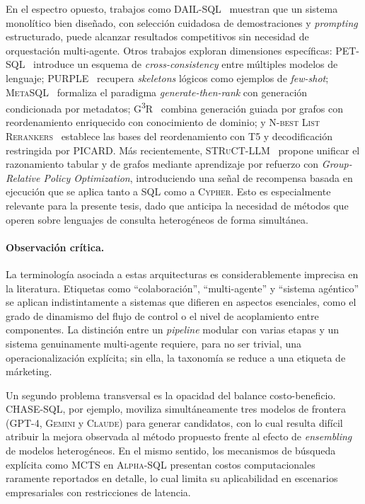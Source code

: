 En el espectro opuesto, trabajos como \textsc{DAIL-SQL}~\cite{DAIL-SQL2023}
muestran que un sistema monolítico bien diseñado, con selección cuidadosa de
demostraciones y \emph{prompting} estructurado, puede alcanzar resultados
competitivos sin necesidad de orquestación multi-agente. Otros trabajos
exploran dimensiones específicas: \textsc{PET-SQL}~\cite{PET-SQL2024}
introduce un esquema de \emph{cross-consistency} entre múltiples modelos de
lenguaje; \textsc{PURPLE}~\cite{PURPLE2024} recupera \emph{skeletons} lógicos
como ejemplos de \emph{few-shot}; \textsc{MetaSQL}~\cite{MetaSQL2024}
formaliza el paradigma \emph{generate-then-rank} con generación condicionada
por metadatos; \textsc{G\textsuperscript{3}R}~\cite{G3R2023} combina
generación guiada por grafos con reordenamiento enriquecido con conocimiento
de dominio; y \textsc{N-best List Rerankers}~\cite{N-bestListRerankers2022}
establece las bases del reordenamiento con \textsc{T5} y decodificación
restringida por \textsc{PICARD}. Más recientemente,
\textsc{STRuCT-LLM}~\cite{STRuCT-LLM2026} propone unificar el razonamiento tabular y de grafos mediante aprendizaje
por refuerzo con \emph{Group-Relative Policy Optimization}, introduciendo
una señal de recompensa basada en ejecución que se aplica tanto a \ac{SQL}
como a \textsc{Cypher}. Esto es especialmente relevante para la presente
tesis, dado que anticipa la necesidad de métodos que operen sobre lenguajes
de consulta heterogéneos de forma simultánea.

\paragraph{Observación crítica.} La terminología asociada a estas
arquitecturas es considerablemente imprecisa en la literatura. Etiquetas
como ``colaboración'', ``multi-agente'' y ``sistema agéntico'' se aplican
indistintamente a sistemas que difieren en aspectos esenciales, como el
grado de dinamismo del flujo de control o el nivel de acoplamiento entre
componentes. La distinción entre un \emph{pipeline} modular con varias etapas
y un sistema genuinamente multi-agente requiere, para no ser trivial, una
operacionalización explícita; sin ella, la taxonomía se reduce a una
etiqueta de márketing.

Un segundo problema transversal es la opacidad del balance
costo-beneficio. \textsc{CHASE-SQL}, por ejemplo, moviliza simultáneamente
tres modelos de frontera (\textsc{GPT-4}, \textsc{Gemini} y \textsc{Claude})
para generar candidatos, con lo cual resulta difícil atribuir la mejora
observada al método propuesto frente al efecto de \emph{ensembling} de
modelos heterogéneos. En el mismo sentido, los mecanismos de búsqueda
explícita como \textsc{MCTS} en \textsc{Alpha-SQL} presentan costos
computacionales raramente reportados en detalle, lo cual limita su
aplicabilidad en escenarios empresariales con restricciones de latencia.

